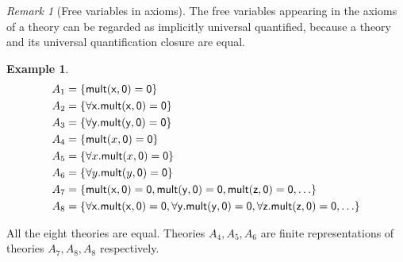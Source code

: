 \documentclass{article}
\newcounter{thmcounter}
\theoremstyle{plain}
\theoremstyle{definition}
\newtheorem{example}[thmcounter]{Example}
\theoremstyle{remark}
\newtheorem{remark}[thmcounter]{Remark}
\begin{document}
\begin{remark}[Free variables in axioms]
\label{rmk:free_variables_in_axioms_are_universal_quantified}
The free variables appearing in the axioms of a theory can be regarded as implicitly universal quantified, because a theory and its universal quantification closure are equal.
\end{remark}

\begin{example}
  \begin{align*}
  A_1 &= \{{\sf mult(x, 0) = 0}\} \\
  A_2 &= \{{\sf \forall x . mult(x, 0) = 0}\} \\
  A_3 &= \{{\sf \forall y . mult(y, 0) = 0}\} \\
  A_4 &= \{\mathsf{mult}(x, \mathsf{0}) = \mathsf{0}\} \\
  A_5 &= \{\forall x . \mathsf{mult}(x, \mathsf{0}) = \mathsf{0}\} \\
  A_6 &= \{\forall y . \mathsf{mult}(y, \mathsf{0}) = \mathsf{0}\} \\
  A_7 &= \{{\sf mult(x, 0) = 0, mult(y, 0) = 0, mult(z, 0) = 0, \dots}\} \\
  A_8 &= \{{\sf \forall x . mult(x, 0) = 0, \forall y . mult(y, 0) = 0, \forall z . mult(z, 0) = 0, \dots}\}
  \end{align*}
  
  All the eight theories are equal. Theories $A_4, A_5, A_6$ are finite representations of theories $A_7, A_8, A_8$ respectively. 
\end{example}


\end{document}
